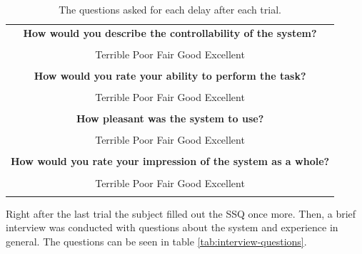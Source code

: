 \documentclass[nofilelist]{cslthse-msc}
\begin{document}
\begin{table}[!hbt]
   \centering
   \begin{tabular}{|c|}
      \hline
      \textbf{How would you describe the controllability of the system?} \\
      \\
      Terrible \hspace{10pt} Poor \hspace{10pt} Fair \hspace{10pt} Good \hspace{10pt} Excellent \\    
      \\
      \hline
      \textbf{How would you rate your ability to perform the task?} \\
      \\
      Terrible \hspace{10pt} Poor \hspace{10pt} Fair \hspace{10pt} Good \hspace{10pt} Excellent \\    
      \\
      \hline
      \textbf{How pleasant was the system to use?} \\
      \\
      Terrible \hspace{10pt} Poor \hspace{10pt} Fair \hspace{10pt} Good \hspace{10pt} Excellent \\    
      \\
      \hline
      \textbf{How would you rate your impression of the system as a whole?} \\
      \\
      Terrible \hspace{10pt} Poor \hspace{10pt} Fair \hspace{10pt} Good \hspace{10pt} Excellent \\    
      \\
      \hline
   \end{tabular}
   \caption{The questions asked for each delay after each trial.}
   \label{tab:form-questions}
\end{table}

\vspace{10pt}

Right after the last trial the subject filled out the SSQ once more. Then, a brief interview was conducted with questions about the system and experience in general. The questions can be seen in table \ref{tab:interview-questions}.
\end{document}
